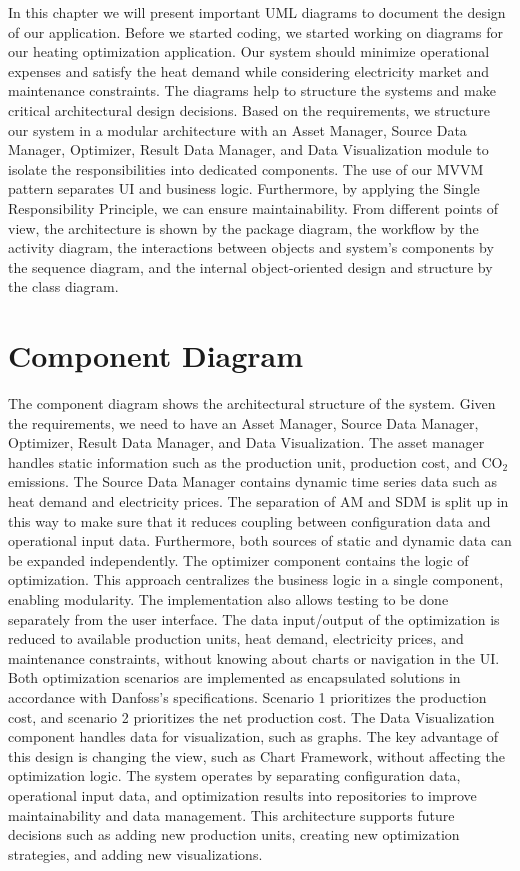 In this chapter we will present important UML diagrams to document the design of our application.
Before we started coding, we started working on diagrams for our heating optimization application.  Our system should minimize operational expenses and satisfy the heat demand while considering electricity market and maintenance constraints. The diagrams help to structure the systems and make critical architectural design decisions. 
Based on the requirements, we structure our system in a modular architecture with an Asset Manager, Source Data Manager, Optimizer, Result Data Manager, and Data Visualization module to isolate the responsibilities into dedicated components. 
The use of our MVVM pattern separates UI and business logic. Furthermore, by applying the Single Responsibility Principle, we can ensure maintainability. 
From different points of view, the architecture is shown by the package diagram, the workflow by the activity diagram, the interactions between objects and system's components by the sequence diagram, and the internal object-oriented design and structure by the class diagram. 
\section{Component Diagram}

The component diagram shows the architectural structure of the system. Given the requirements, we need to have an Asset Manager, Source Data Manager, Optimizer, Result Data Manager, and Data Visualization. 
The asset manager handles static information such as the production unit, production cost, and CO$_2$ emissions. 
The Source Data Manager contains dynamic time series data such as heat demand and electricity prices. 
The separation of AM and SDM is split up in this way to make sure that it reduces coupling between configuration data and operational input data. Furthermore, both sources of static and dynamic data can be expanded independently. 
The optimizer component contains the logic of optimization. This approach centralizes the business logic in a single component, enabling modularity. The implementation also allows testing to be done separately from the user interface. The data input/output of the optimization is reduced to available production units, heat demand, electricity prices, and maintenance constraints, without knowing about charts or navigation in the UI. 
Both optimization scenarios are implemented as encapsulated solutions in accordance with Danfoss’s specifications. Scenario 1 prioritizes the production cost, and scenario 2 prioritizes the net production cost. 
The Data Visualization component handles data for visualization, such as graphs. The key advantage of this design is changing the view, such as Chart Framework, without affecting the optimization logic. 
The system operates by separating configuration data, operational input data, and optimization results into repositories to improve maintainability and data management. 
This architecture supports future decisions such as adding new production units, creating new optimization strategies, and adding new visualizations. 

